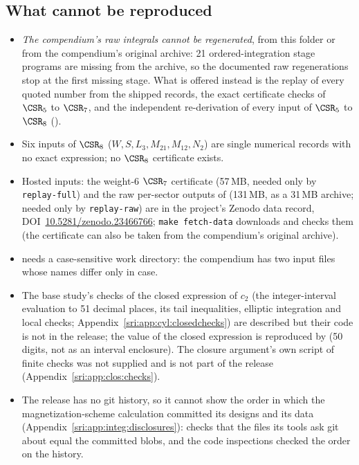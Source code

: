\subsection{What cannot be reproduced}\label{sri:app:cannot}
\begin{itemize}
\item \emph{The compendium's raw integrals cannot be regenerated}, from this folder or from the compendium's original
 archive: 21 ordered-integration stage programs are missing from the archive, so the documented raw regenerations stop
 at the first missing stage. What is offered instead is the replay of every quoted number from the shipped records,
 the exact certificate checks of $\CSR_5$ to $\CSR_7$, and the independent re-derivation of every input of $\CSR_5$
 to $\CSR_8$ ().
\item Six inputs of $\CSR_8$ ($W,S,L_3,M_{21},M_{12},N_2$) are single numerical records with no exact expression; no
 $\CSR_8$ certificate exists.
\item Hosted inputs: the weight-6 $\CSR_7$ certificate (57\,MB, needed only by  \texttt{replay-full}) and
 the raw per-sector outputs of  (131\,MB, as a 31\,MB archive; needed only by \texttt{replay-raw}) are in
 the project's Zenodo data record, DOI~\href{https://doi.org/10.5281/zenodo.23466766}{10.5281/zenodo.23466766};
 \texttt{make fetch-data} downloads and checks them (the certificate can also be taken from the compendium's original
 archive).
\item {} needs a case-sensitive work directory: the compendium has two input files whose names differ
 only in case.
\item The base study's checks of the closed expression of $c_2$ (the integer-interval evaluation to 51 decimal places,
 its tail inequalities, elliptic integration and local checks; Appendix~\ref{sri:app:cyl:closedchecks}) are described but
 their code is not in the release; the value of the closed expression is reproduced by  (50 digits,
 not as an interval enclosure). The closure argument's own script of finite checks was not
 supplied and is not part of the release (Appendix~\ref{sri:app:clos:checks}).
\item The release has no git history, so it cannot show the order in which the magnetization-scheme calculation
 committed its designs and its data (Appendix~\ref{sri:app:integ:disclosures}):  checks that the files its
 tools ask git about equal the committed blobs, and the code inspections checked the order on the history.

\end{itemize}
